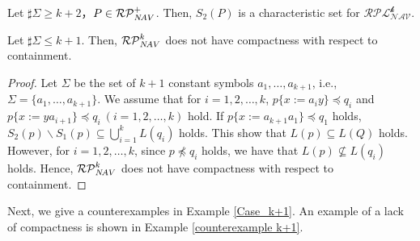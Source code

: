 \begin{col}
Let $\sharp\Sigma \ge k+2$，$P \in \mathcal{RP}^{+}_{N\!AV}$.
Then, $S_{2}(P)$ is a characteristic set for $\mathcal{RPL^{\mbox{$k$}}_{NAV}}$.
\end{col}

\begin{lem}\label{Case_k+2}\label{k+2のとき}
Let $\sharp\Sigma \le k+1$.
Then, $\mathcal{RP}^{k}_{N\!AV}$ does not have compactness with respect to containment.
\end{lem}
\begin{proof}
Let $\Sigma$ be the set of $k+1$ constant symbols $a_{1}, \ldots , a_{k+1}$, i.e., $\Sigma = \{ a_{1}, \ldots , a_{k+1} \}$.
We assume that for $i=1,2,\ldots,k$, $p \{ x := a_{i}y \} \preceq q_{i}$ and $p \{ x := ya_{i+1} \} \preceq q_{i}~(i=1,2, \ldots ,k)$ hold.
If $p \{ x:= a_{k+1}a_{1} \} \preceq q_{1}$ holds, $S_{2}(p) \backslash S_{1}(p) \subseteq \bigcup^{k}_{i=1} L(q_{i})$ holds.
This show that $L(p) \subseteq L(Q)$ holds.
However, for $i=1,2,\ldots,k$, since $p \not \preceq q_{i}$ holds, we have that $L(p) \not \subseteq L(q_{i})$ holds.
Hence, $\mathcal{RP}^{k}_{N\!AV}$ does not have compactness with respect to containment.
\end{proof}

Next, we give a counterexamples in Example \ref{Case_k+1}.
An example of a lack of compactness is shown in Example \ref{counterexample k+1}.


